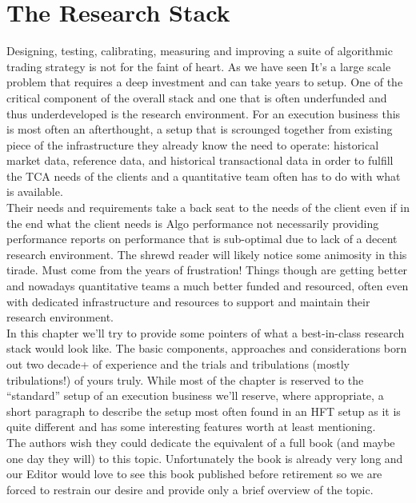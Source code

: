 
\chapter{The Research Stack}\label{chap:ch_tech_res}
Designing, testing, calibrating, measuring and improving a suite of algorithmic trading strategy is not for the faint of heart. As we have  seen It's a large scale problem that requires a deep investment and can take years to setup. One of the critical component of the overall stack and one that is often underfunded and thus underdeveloped is the research environment. For an execution business this is most often an afterthought, a setup that is scrounged together from existing piece of the infrastructure they already know the need to operate: historical market data, reference data, and historical transactional data in order to fulfill the TCA needs of the clients and a quantitative team often has to do with what is available. \\

Their needs and requirements take a back seat to the needs of the client even if in the end what the client needs is Algo performance not necessarily providing performance reports on  performance that is sub-optimal due to lack of a decent research environment. The shrewd reader will likely notice some animosity in this tirade. Must come from the years of frustration! Things though are getting better and nowadays quantitative teams a much better funded and resourced, often even with dedicated infrastructure and resources to support and maintain their research environment.\\

In this chapter we'll try to provide some pointers of what a best-in-class research stack would look like. The basic components, approaches and considerations born out two decade+  of experience and the trials and tribulations (mostly tribulations!) of yours truly. While most of the chapter is reserved to the ``standard'' setup of an execution business we'll reserve, where appropriate, a short paragraph to describe the setup most often found in an HFT setup as it is quite different and has some interesting features worth at least mentioning.\\


The authors wish they could dedicate the equivalent of a full book (and maybe one day they will) to this topic. Unfortunately the book is already very long and our Editor would love to see this book published before retirement so we are forced to restrain our desire and provide only a brief overview of the topic.  

